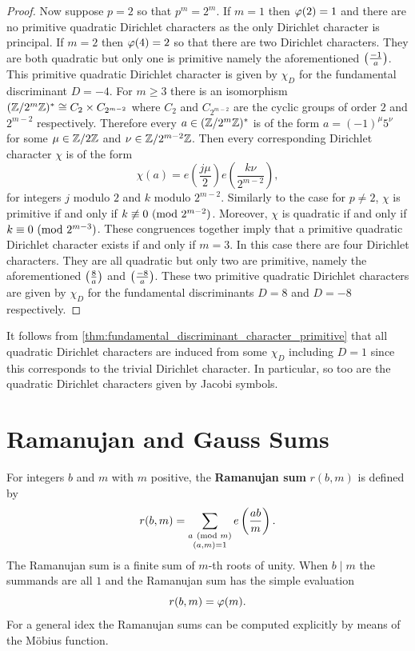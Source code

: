 \begin{proof}
      Now suppose \(p = 2\) so that \(p^{m} = 2^{m}\). If \(m = 1\) then \(\varphi(2) = 1\) and there are no primitive quadratic Dirichlet characters as the only Dirichlet character is principal. If \(m = 2\) then \(\varphi(4) = 2\) so that there are two Dirichlet characters. They are both quadratic but only one is primitive namely the aforementioned \(\textstyle{\left(\frac{-1}{a}\right)}\). This primitive quadratic Dirichlet character is given by \(\chi_{D}\) for the fundamental discriminant \(D = -4\). For \(m \ge 3\) there is an isomorphism \((\mathbb{Z}/2^{m}\mathbb{Z})^{\ast} \cong C_{2} \times C_{2^{m-2}}\) where \(C_{2}\) and \(C_{2^{m-2}}\) are the cyclic groups of order \(2\) and \(2^{m-2}\) respectively. Therefore every \(a \in (\mathbb{Z}/2^{m}\mathbb{Z})^{\ast}\) is of the form \(a = (-1)^{\mu}5^{\nu}\) for some \(\mu \in \mathbb{Z}/2\mathbb{Z}\) and \(\nu \in \mathbb{Z}/2^{m-2}\mathbb{Z}\). Then every corresponding Dirichlet character \(\chi\) is of the form
      \[
        \chi(a) = e\left(\frac{j\mu}{2}\right)e\left(\frac{k\nu}{2^{m-2}}\right),
      \]
      for integers \(j\) modulo \(2\) and \(k\) modulo \(2^{m-2}\). Similarly to the case for \(p \neq 2\), \(\chi\) is primitive if and only if \(k \not\equiv 0 \ (\mathrm{mod}\text{ }2^{m-2})\). Moreover, \(\chi\) is quadratic if and only if \(k \equiv 0 \ (\mathrm{mod}\text{ }2^{m-3})\). These congruences together imply that a primitive quadratic Dirichlet character exists if and only if \(m = 3\). In this case there are four Dirichlet characters. They are all quadratic but only two are primitive, namely the aforementioned \(\textstyle{\left(\frac{8}{a}\right)}\) and \(\textstyle{\left(\frac{-8}{a}\right)}\). These two primitive quadratic Dirichlet characters are given by \(\chi_{D}\) for the fundamental discriminants \(D = 8\) and \(D = -8\) respectively.
    \end{proof}

    It follows from \cref{thm:fundamental_discriminant_character_primitive} that all quadratic Dirichlet characters are induced from some \(\chi_{D}\) including \(D = 1\) since this corresponds to the trivial Dirichlet character. In particular, so too are the quadratic Dirichlet characters given by Jacobi symbols.
  \section{Ramanujan and Gauss Sums}
    For integers \(b\) and \(m\) with \(m\) positive, the \textbf{Ramanujan sum} \(r(b,m)\) is defined by
    \[
      r(b,m) = \sum_{\substack{a \ (\mathrm{mod}\text{ }m) \\ (a,m) = 1}}e\left(\frac{ab}{m}\right).
    \]
    The Ramanujan sum is a finite sum of \(m\)-th roots of unity. When \(b \mid m\) the summands are all \(1\) and the Ramanujan sum has the simple evaluation
    \[
      r(b,m) = \varphi(m).
    \]
    For a general idex the Ramanujan sums can be computed explicitly by means of the M\"obius function.

